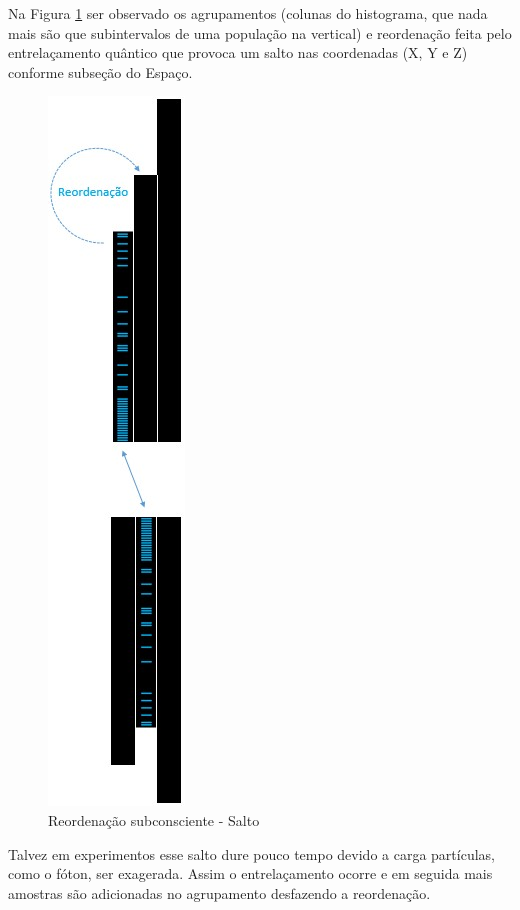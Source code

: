 Na Figura \ref{fig:consciousness_space_subconscious_observation_jump} ser observado os agrupamentos (colunas do histograma, que nada mais são que subintervalos de uma população na vertical) e reordenação feita pelo entrelaçamento quântico que provoca um salto nas coordenadas (X, Y e Z) conforme subseção do Espaço.
\begin{figure}[H]
\caption{Reordenação subconsciente - Salto}
\label{fig:consciousness_space_subconscious_observation_jump}
\centering
\includegraphics[scale=.6]{sections/images/consciousness_space_subconscious_observation_jump.jpg}
\end{figure}

Talvez em experimentos esse salto dure pouco tempo devido a carga partículas, como o fóton, ser exagerada. Assim o entrelaçamento ocorre e em seguida mais amostras são adicionadas no agrupamento desfazendo a reordenação. 

